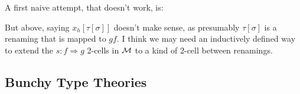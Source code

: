 \documentclass[10pt]{article}
\let\emptyset\varnothing
\newcommand{\yields}{\vdash}
\newcommand{\type}{\,\,\mathsf{type}}
\DeclareMathOperator{\ob}{ob}
\begin{document}
A first naive attempt, that doesn't work, is:

But above, saying $x_h[\tau[\sigma]]$ doesn't make sense, as presumably $\tau[\sigma]$ is a renaming that is mapped to $gf$. I think we may need an inductively defined way to extend the $s : f \Rightarrow g$ 2-cells in $\mathcal{M}$ to a kind of 2-cell between renamings. 

\subsection{Bunchy Type Theories}
\end{document}
